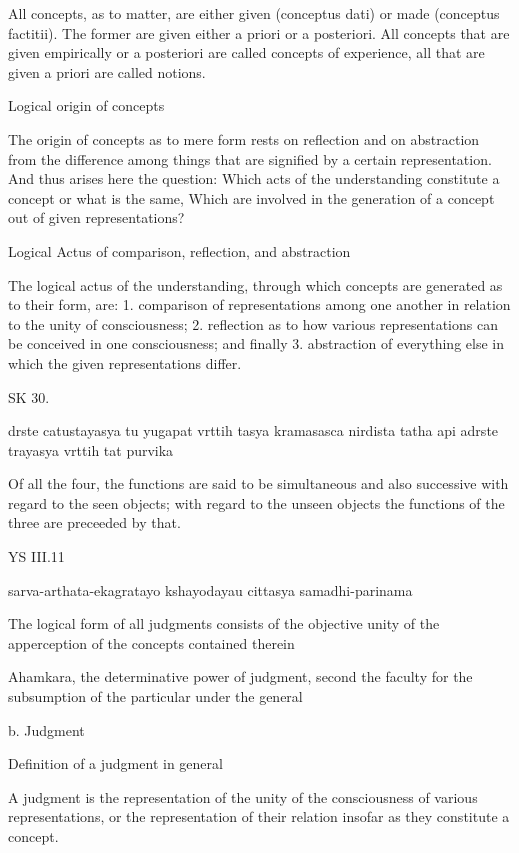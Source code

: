        All concepts, as to matter, are either
        given (conceptus dati) or made (conceptus factitii).
        The former are given either a priori or a posteriori.
        All concepts that are given empirically or a posteriori
        are called concepts of experience,
        all that are given a priori are called notions.

    Logical origin of concepts

        The origin of concepts as to mere form rests on reflection and on abstraction from
        the difference among things that are signified by a certain representation.
        And thus arises here the question: Which acts of the understanding constitute a concept or
        what is the same, Which are involved in the generation of a concept out of given representations?

    Logical Actus of comparison, reflection, and abstraction

        The logical actus of the understanding,
        through which concepts are generated as to their form, are:
        1. comparison of representations among one another in relation to the unity of consciousness;
        2. reflection as to how various representations can be conceived in one consciousness; and finally
        3. abstraction of everything else in which the given representations differ.

SK 30.

drste catustayasya tu yugapat vrttih tasya kramasasca nirdista
tatha api adrste trayasya vrttih tat purvika

Of all the four, the functions are said to be simultaneous and also successive
with regard to the seen objects;
with regard to the unseen objects
the functions of the three are preceeded by that.

YS III.11

    sarva-arthata-ekagratayo kshayodayau cittasya samadhi-parinama

    The logical form of all judgments consists of the objective unity of
    the apperception of the concepts contained therein

    Ahamkara, the determinative power of judgment,
    second the faculty for the subsumption of the particular under the general

    b. Judgment

    Definition of a judgment in general

        A judgment is the representation of the unity of the consciousness of various representations,
        or the representation of their relation insofar as they constitute a concept.

